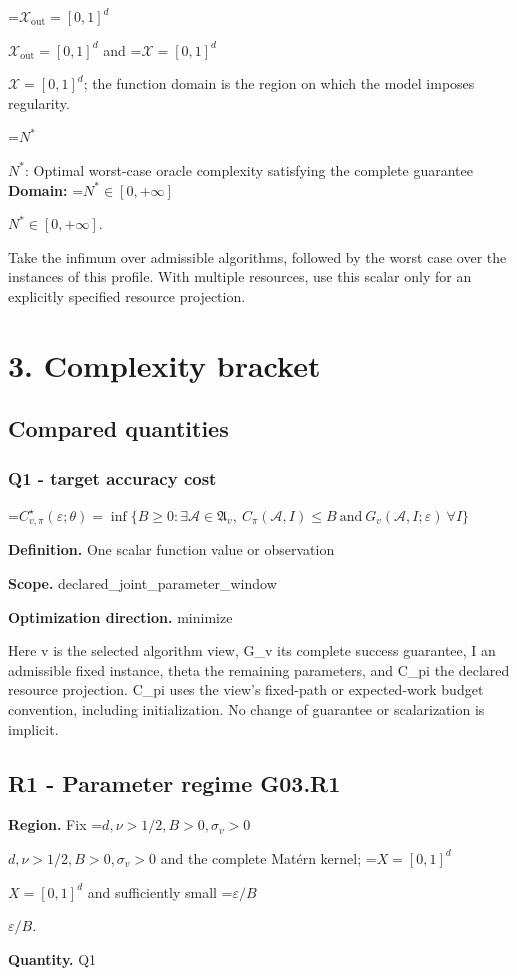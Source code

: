 \documentclass[10pt,a4paper]{article}
\newcommand{\AtlasMath}[1]{\par\begingroup\centering\setbox0=\hbox{$\displaystyle #1$}\ifdim\wd0>1.4\linewidth\typeout{ATLAS WIDE FORMULA: \the\wd0}\fi\ifdim\wd0>\linewidth\resizebox{\linewidth}{!}{\box0}\else\box0\fi\par\endgroup}
\newcommand{\AtlasInlineMath}[1]{\begingroup\setbox0=\hbox{$#1$}\ifdim\wd0>.4\linewidth\endgroup\AtlasMath{#1}\else\endgroup$#1$\fi}
\begin{document}
\AtlasInlineMath{\mathcal{X}_{\mathrm{out}}=[0,1]^d} and \AtlasInlineMath{\mathcal{X}=[0,1]^d}; the function domain is the region on which the model imposes regularity.

\AtlasInlineMath{N^*}: Optimal worst-case oracle complexity satisfying the complete guarantee \textbf{Domain:} \AtlasInlineMath{N^*\in[0,+\infty]}.

Take the infimum over admissible algorithms, followed by the worst case over the instances of this profile. With multiple resources, use this scalar only for an explicitly specified resource projection.

\section{3. Complexity bracket}
\subsection{Compared quantities}
\subsubsection{Q1 - target accuracy cost}
\AtlasMath{C^\star_{v,\pi}(\varepsilon;\theta)=\inf\{B\ge0:\exists\mathcal A\in\mathfrak A_v,\ C_\pi(\mathcal A,I)\le B\ \text{and}\ G_v(\mathcal A,I;\varepsilon)\ \forall I\}}
\textbf{Definition.} One scalar function value or observation

\textbf{Scope.} declared\_joint\_parameter\_window

\textbf{Optimization direction.} minimize

Here v is the selected algorithm view, G\_v its complete success guarantee, I an admissible fixed instance, theta the remaining parameters, and C\_pi the declared resource projection. C\_pi uses the view's fixed-path or expected-work budget convention, including initialization. No change of guarantee or scalarization is implicit.

\subsection{R1 - Parameter regime G03.R1}
\textbf{Region.} Fix \AtlasInlineMath{d,\nu>1/2,B>0,\sigma_v>0} and the complete Matérn kernel; \AtlasInlineMath{X=[0,1]^d} and sufficiently small \AtlasInlineMath{\varepsilon/B}.

\textbf{Quantity.} Q1
\end{document}

